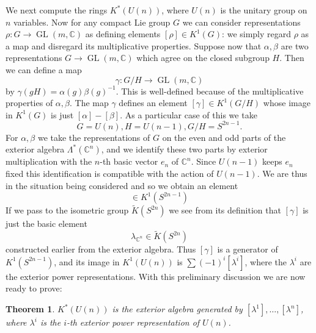 \documentclass[leqno]{book}
\numberwithin{equation}{section}
\newtheorem{theorem}{Theorem}[section]%
\theoremstyle{definition}
\begin{document}
            We next compute the rings $K^{*}(U(n))$, where $U(n)$ is the unitary group on $n$ variables. Now for any compact Lie group $G$ we can consider representations $\rho:G\to \operatorname{GL}(m,\mathbb{C})$ as defining elements $[\rho]\in K^{1}(G)$: we simply regard $\rho$ as a map and disregard its multiplicative properties. Suppose now that $\alpha,\beta$ are two representations $G\to \operatorname{GL}(m,\mathbb{C})$ which agree on the closed subgroup $H$. Then we can define a map
            \begin{equation*}
              \gamma:G/H \to \operatorname{GL}(m,\mathbb{C})
            \end{equation*}
            by $\gamma(gH)=\alpha(g)\beta(g)^{-1}$. This is well-defined because of the multiplicative properties of $\alpha,\beta$. The map $\gamma$ defines an element $[\gamma]\in K^{1}(G/H)$ whose image in $K^{1}(G)$ is just $[\alpha]-[\beta]$. As a particular case of this we take
            \begin{equation*}
              G=U(n), H=U(n-1), G/H=S^{2n-1}.
            \end{equation*}
            For $\alpha, \beta$ we take the representations of $G$ on the even and odd parts of the exterior algebra $\Lambda^{*}(\mathbb{C}^{n})$, and we identify these two parts by exterior multiplication with the $n$-th basic vector $e_{n}$ of $\mathbb{C}^{n}$. Since $U(n-1)$ keeps $e_{n}$ fixed this identification is compatible with the action of $U(n-1)$. We are thus in the situation being considered and so we obtain an element
            \begin{equation*}
              [\gamma]\in K^{1}(S^{2n-1})
            \end{equation*}
            If we pass to the isometric group $\tilde{K}(S^{2n})$ we see from its definition that $[\gamma]$ is just the basic element
            \begin{equation*}
              \lambda_{\mathbb{C}^{n}}\in \tilde{K}(S^{2n})
            \end{equation*}
            constructed earlier from the exterior algebra. Thus $[\gamma]$ is a generator of $K^{1}(S^{2n-1})$, and its image in $K^{1}(U(n))$ is $\sum (-1)^{i}[\lambda^{i}]$, where the $\lambda^{i}$ are the exterior power representations. With this preliminary discussion we are now ready to prove:

            \begin{theorem}
              $K^{*}(U(n))$ is the exterior algebra generated by $[\lambda^{1}], \ldots ,[\lambda^{n}]$, where $\lambda^{i}$ is the $i$-th exterior power representation of $U(n)$.
            \end{theorem}
\end{document}
